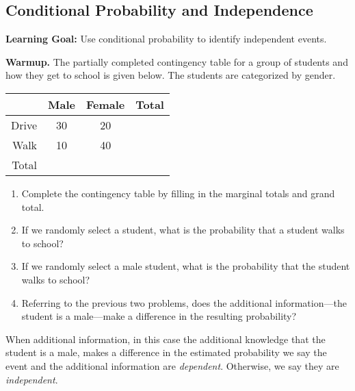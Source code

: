 \cleardoublepage
\subsection{Conditional Probability and Independence}
\textbf{Learning Goal:} Use conditional probability to identify independent events.

\textbf{Warmup.} The partially completed contingency table for a group of students and how they get to school is given below. The students are categorized by gender.

\begin{table}[h]
\centering
\begin{tabular}{|r|c|c|c|} \hline
&Male&Female&Total\\
\hline
Drive & 30 & 20 & \\
\hline
Walk & 10 & 40 & \\
\hline
Total & & & \\
\hline
\end{tabular}
\end{table}

\begin{enumerate}
\item Complete the contingency table by filling in the marginal totals and grand total.
\item If we randomly select a student, what is the probability that a student walks to school? \\[.5cm]
\item If we randomly select a male student, what is the probability that the student walks to school?\\[.5cm]
\item Referring to the previous two problems, does the additional information---the student is a male---make a difference in the resulting probability?\\[.5cm]
\end{enumerate}

When additional information, in this case the additional knowledge that the student is a male, makes a difference in the estimated probability we say the event and the additional information are \emph{dependent}. Otherwise, we say they are \emph{independent}.

